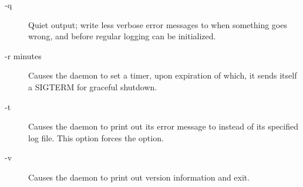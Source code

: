 \begin{description}
\item[-q] Quiet output; write less verbose error
 messages to  when something goes wrong,
 and before regular logging can be initialized.

\item[-r minutes] Causes the daemon to set a timer, upon expiration
  of which, it sends itself a SIGTERM for graceful shutdown.

\item[-t] Causes the daemon to print out its error message to
   instead of its specified log file.  This option forces
  the  option.

\item[-v] Causes the daemon to print out version information and
  exit.

\end{description}

